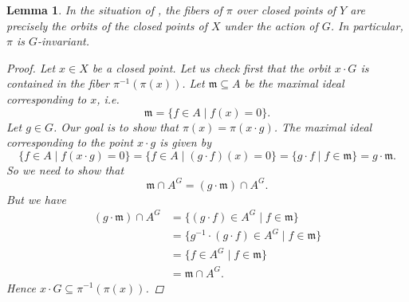 \documentclass[12pt,a4paper]{amsart}
\theoremstyle{plain}
\newtheorem{lm}[thm]{Lemma}
\theoremstyle{definition}
\theoremstyle{remark}
\begin{document}
\begin{lm}\label{lm:fibers}
  In the situation of , the fibers of $\pi$ over closed points of $Y$ are precisely the orbits of the closed points of $X$ under the action of $G$.
  In particular, $\pi$ is $G$-invariant.

  \begin{proof}
    Let $x \in X$ be a closed point.
    Let us check first that the orbit $x \cdot G$ is contained in the fiber $\pi^{-1}(\pi(x))$.
    Let $\mathfrak{m} \subseteq A$ be the maximal ideal corresponding to $x$, i.e.
    \[ \mathfrak{m} = \{ f \in A \mid f(x) = 0 \}. \]
    Let $g \in G$.
    Our goal is to show that $\pi(x) = \pi(x \cdot g)$.
    The maximal ideal corresponding to the point $x \cdot g$ is given by
    \[ \{ f \in A \mid f(x \cdot g) = 0 \} = \{ f \in A \mid (g \cdot f)(x) = 0 \} = \{ g\cdot f \mid f \in \mathfrak{m} \} = g \cdot \mathfrak{m}. \]
    So we need to show that
    \[ \mathfrak{m} \cap A^{G} = (g \cdot \mathfrak{m}) \cap A^{G}. \]
    But we have
    \begin{align*}
      (g \cdot \mathfrak{m}) \cap A^{G} & = \{ (g \cdot f) \in A^{G} \mid f \in \mathfrak{m} \} \\
      & = \{ g^{-1} \cdot (g \cdot f) \in A^{G} \mid f \in \mathfrak{m} \} \\
      & = \{ f \in A^{G} \mid f \in \mathfrak{m} \} \\
      & = \mathfrak{m} \cap A^{G}. 
    \end{align*}
    Hence $x \cdot G \subseteq \pi^{-1}(\pi(x))$.


\end{proof}
\end{lm}
\end{document}
